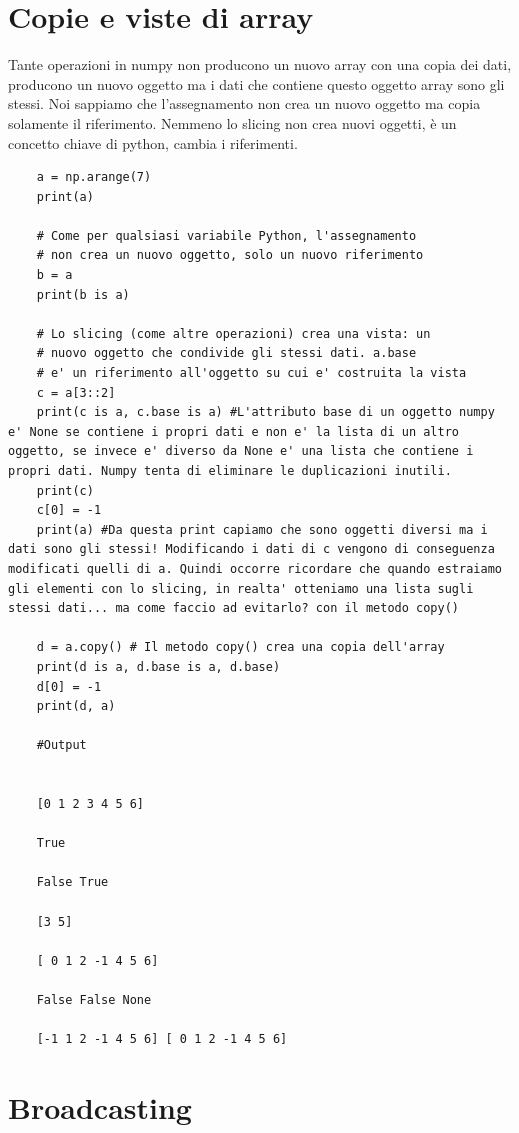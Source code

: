 \section{Copie e viste di array}

Tante operazioni in numpy non producono un nuovo array con una copia dei dati, producono un nuovo oggetto ma i dati che contiene questo oggetto array sono gli stessi. Noi sappiamo che l'assegnamento non crea un nuovo oggetto ma copia solamente il riferimento. Nemmeno lo slicing non crea nuovi oggetti, è un concetto chiave di python, cambia i riferimenti.

\begin{lstlisting}
	a = np.arange(7)
	print(a)
	
	# Come per qualsiasi variabile Python, l'assegnamento
	# non crea un nuovo oggetto, solo un nuovo riferimento
	b = a
	print(b is a)
	
	# Lo slicing (come altre operazioni) crea una vista: un
	# nuovo oggetto che condivide gli stessi dati. a.base
	# e' un riferimento all'oggetto su cui e' costruita la vista
	c = a[3::2]
	print(c is a, c.base is a) #L'attributo base di un oggetto numpy e' None se contiene i propri dati e non e' la lista di un altro oggetto, se invece e' diverso da None e' una lista che contiene i propri dati. Numpy tenta di eliminare le duplicazioni inutili.
	print(c)
	c[0] = -1
	print(a) #Da questa print capiamo che sono oggetti diversi ma i dati sono gli stessi! Modificando i dati di c vengono di conseguenza modificati quelli di a. Quindi occorre ricordare che quando estraiamo gli elementi con lo slicing, in realta' otteniamo una lista sugli stessi dati... ma come faccio ad evitarlo? con il metodo copy()
	
	d = a.copy() # Il metodo copy() crea una copia dell'array
	print(d is a, d.base is a, d.base)
	d[0] = -1
	print(d, a)
	
	#Output
	
	
	[0 1 2 3 4 5 6]
	
	True
	
	False True
	
	[3 5]
	
	[ 0 1 2 -1 4 5 6]
	
	False False None
	
	[-1 1 2 -1 4 5 6] [ 0 1 2 -1 4 5 6]
\end{lstlisting}

\newpage

\section{Broadcasting}

